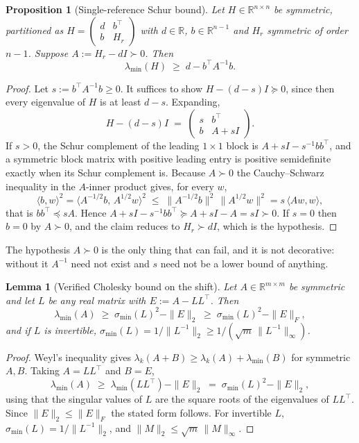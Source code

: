 \documentclass[11pt,a4paper]{article}
\theoremstyle{plain}
\newtheorem{lemma}[theorem]{Lemma}
\newtheorem{proposition}[theorem]{Proposition}
\theoremstyle{definition}
\theoremstyle{remark}
\newcommand{\R}{\mathbb{R}}
\begin{document}
\begin{proposition}[Single-reference Schur bound]
\label{prop:schur}
Let $H\in\R^{n\times n}$ be symmetric, partitioned as
$H=\begin{pmatrix} d & b^\top\\ b & H_r\end{pmatrix}$ with $d\in\R$,
$b\in\R^{n-1}$ and $H_r$ symmetric of order $n-1$. Suppose
$A := H_r - dI \succ 0$. Then
\[
  \lambda_{\min}(H) \;\ge\; d - b^\top A^{-1} b .
\]
\end{proposition}
\begin{proof}
Let $s := b^\top A^{-1}b \ge 0$. It suffices to show $H-(d-s)I \succeq 0$, since then
every eigenvalue of $H$ is at least $d-s$. Expanding,
\[
  H-(d-s)I \;=\;
  \begin{pmatrix} s & b^\top\\ b & A+sI\end{pmatrix}.
\]
If $s>0$, the Schur complement of the leading $1\times1$ block is
$A+sI - s^{-1}bb^\top$, and a symmetric block matrix with positive leading entry is
positive semidefinite exactly when its Schur complement is. Because $A\succ0$ the
Cauchy--Schwarz inequality in the $A$-inner product gives, for every $w$,
\[
  \langle b,w\rangle^{2}
  = \langle A^{-1/2}b,\,A^{1/2}w\rangle^{2}
  \;\le\; \|A^{-1/2}b\|^{2}\,\|A^{1/2}w\|^{2}
  = s\,\langle Aw,w\rangle,
\]
that is $bb^\top \preceq sA$. Hence
$A+sI-s^{-1}bb^\top \succeq A+sI-A = sI \succ 0$. If $s=0$ then $b=0$ by
$A\succ0$, and the claim reduces to $H_r\succ dI$, which is the hypothesis.
\end{proof}

The hypothesis $A\succ0$ is the only thing that can fail, and it is not decorative:
without it $A^{-1}$ need not exist and $s$ need not be a lower bound of anything.

\begin{lemma}[Verified Cholesky bound on the shift]
\label{lem:cholesky}
Let $A\in\R^{m\times m}$ be symmetric and let $L$ be any real matrix with
$E := A-LL^\top$. Then
\[
  \lambda_{\min}(A) \;\ge\; \sigma_{\min}(L)^{2} - \|E\|_2
  \;\ge\; \sigma_{\min}(L)^{2} - \|E\|_F ,
\]
and if $L$ is invertible, $\sigma_{\min}(L)=1/\|L^{-1}\|_2 \ge 1/(\sqrt m\,\|L^{-1}\|_\infty)$.
\end{lemma}
\begin{proof}
Weyl's inequality gives $\lambda_k(A+B)\ge \lambda_k(A)+\lambda_{\min}(B)$ for
symmetric $A,B$. Taking $A=LL^\top$ and $B=E$,
\[
  \lambda_{\min}(A) \;\ge\; \lambda_{\min}(LL^\top) - \|E\|_2
  \;=\; \sigma_{\min}(L)^{2} - \|E\|_2 ,
\]
using that the singular values of $L$ are the square roots of the eigenvalues of
$LL^\top$. Since $\|E\|_2\le\|E\|_F$ the stated form follows. For invertible $L$,
$\sigma_{\min}(L)=1/\|L^{-1}\|_2$, and $\|M\|_2\le\sqrt m\,\|M\|_\infty$.
\end{proof}
\end{document}
